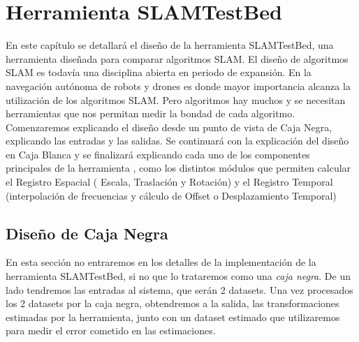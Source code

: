 \newpage
\chapter{Herramienta SLAMTestBed} \label{cap:Herramienta SLAMTestBed} %
En este capítulo se detallará el diseño de la herramienta SLAMTestBed, una herramienta diseñada para comparar algoritmos SLAM. El diseño de algoritmos SLAM es todavía una disciplina abierta en periodo de expansión. En la navegación autónoma de robots y drones es donde mayor importancia alcanza la utilización de los algoritmos SLAM. Pero algoritmos hay muchos y se necesitan herramientas que nos permitan medir la bondad de cada algoritmo.
Comenzaremos explicando el diseño desde un punto de vista de Caja Negra, explicando las entradas y las salidas. Se continuará con la explicación del diseño en Caja Blanca y se finalizará explicando cada uno de los componentes principales de la herramienta , como los distintos módulos que permiten calcular el Registro Espacial ( Escala, Traslación y Rotación) y el Registro Temporal (interpolación de frecuencias y cálculo de Offset o Desplazamiento Temporal)

\section{Diseño de Caja Negra}

En esta sección no entraremos en los detalles de la implementación de la herramienta SLAMTestBed, si no que lo trataremos como una \textit{caja negra}.
De un lado tendremos las entradas al sistema, que serán 2 datasets.
Una vez procesados los 2 datasets por la caja negra, obtendremos a la salida, las transformaciones estimadas por la herramienta, junto con un dataset estimado que utilizaremos para medir el error cometido en las estimaciones.


